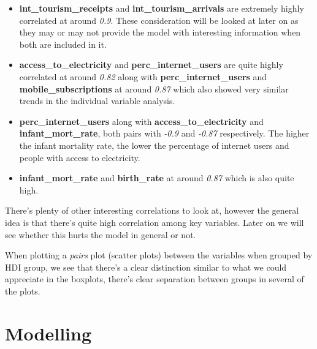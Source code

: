 \documentclass[]{article}
\providecommand{\tightlist}{%
  \setlength{\itemsep}{0pt}\setlength{\parskip}{0pt}}
\begin{document}
\begin{itemize}
\tightlist
\item
  \textbf{int\_tourism\_receipts} and \textbf{int\_tourism\_arrivals}
  are extremely highly correlated at around \emph{0.9}. These
  consideration will be looked at later on as they may or may not
  provide the model with interesting information when both are included
  in it.
\item
  \textbf{access\_to\_electricity} and \textbf{perc\_internet\_users}
  are quite highly correlated at around \emph{0.82} along with
  \textbf{perc\_internet\_users} and \textbf{mobile\_subscriptions} at
  around \emph{0.87} which also showed very similar trends in the
  individual variable analysis.
\item
  \textbf{perc\_internet\_users} along with
  \textbf{access\_to\_electricity} and \textbf{infant\_mort\_rate}, both
  pairs with \emph{-0.9} and \emph{-0.87} respectively. The higher the
  infant mortality rate, the lower the percentage of internet users and
  people with access to electricity.
\item
  \textbf{infant\_mort\_rate} and \textbf{birth\_rate} at around
  \emph{0.87} which is also quite high.
\end{itemize}

There's plenty of other interesting correlations to look at, however the
general idea is that there's quite high correlation among key variables.
Later on we will see whether this hurts the model in general or not.

When plotting a \emph{pairs} plot (scatter plots) between the variables
when grouped by HDI group, we see that there's a clear distinction
similar to what we could appreciate in the boxplots, there's clear
separation between groups in several of the plots.

\newpage

\hypertarget{modelling}{%
\section{Modelling}\label{modelling}}
\end{document}
